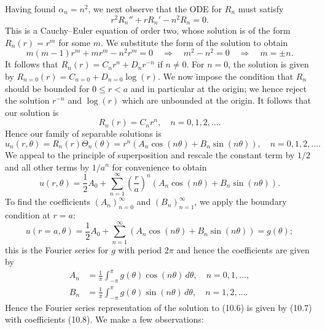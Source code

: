 Having found $\alpha_n = n^2$, we next observe that the ODE for $R_n$ must satisfy
\[r^2R_n'' + rR_n' - n^2R_n = 0.\]
This is a Cauchy--Euler equation of order two, whose solution is of the form $R_n(r) = r^m$ for some $m$. We substitute the form of the solution to obtain
\[m(m - 1)r^m + mr^m - n^2r^m = 0 \quad \Rightarrow \quad m^2 - n^2 = 0 \quad \Rightarrow \quad m = \pm n.\]
It follows that $R_n(r) = C_nr^n + D_nr^{-n}$ if $n \neq 0$. For $n = 0$, the solution is given by $R_{n=0}(r) = C_{n=0} + D_{n=0}\log(r)$. We now impose the condition that $R_n$ should be bounded for $0 \leq r < a$ and in particular at the origin; we hence reject the solution $r^{-n}$ and $\log(r)$ which are unbounded at the origin. It follows that our solution is
\[R_n(r) = C_nr^n, \quad n = 0, 1, 2, \dots.\]
Hence our family of separable solutions is
\[u_n(r, \theta) = R_n(r)\Theta_n(\theta) = r^n(A_n\cos(n\theta) + B_n\sin(n\theta)), \quad n = 0, 1, 2, \dots.\]
We appeal to the principle of superposition and rescale the constant term by $1/2$ and all other terms by $1/a^n$ for convenience to obtain
\begin{equation*}
    u(r, \theta) = \frac{1}{2}A_0 + \sum_{n=1}^{\infty} \left(\frac{r}{a}\right)^n (A_n\cos(n\theta) + B_n\sin(n\theta)). \tag{10.7}
\end{equation*}
To find the coefficients $(A_n)_{n=0}^{\infty}$ and $(B_n)_{n=1}^{\infty}$, we apply the boundary condition at $r = a$:
\[u(r = a, \theta) = \frac{1}{2}A_0 + \sum_{n=1}^{\infty} (A_n\cos(n\theta) + B_n\sin(n\theta)) = g(\theta);\]
this is the Fourier series for $g$ with period $2\pi$ and hence the coefficients are given by
\begin{equation*}
    \begin{aligned}
        A_n &= \frac{1}{\pi} \int_{-\pi}^{\pi} g(\theta)\cos(n\theta)\,d\theta, \quad n = 0, 1, \dots, \\
        B_n &= \frac{1}{\pi} \int_{-\pi}^{\pi} g(\theta)\sin(n\theta)\,d\theta, \quad n = 1, 2, \dots.
    \end{aligned} \tag{10.8}
\end{equation*}
Hence the Fourier series representation of the solution to (10.6) is given by (10.7) with coefficients (10.8). We make a few observations:
